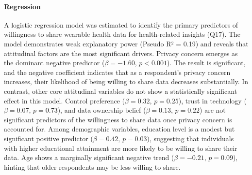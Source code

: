 		\paragraph{Regression}
		A logistic regression model was estimated to identify the primary predictors of willingness to share wearable health data for health-related insights (Q17). The model demonstrates weak explanatory power (Pseudo R² = 0.19) and reveals that attitudinal factors are the most significant drivers.
		Privacy concern emerges as the dominant negative predictor ($\beta = -1.60$, $p < 0.001$). The result is significant, and the negative coefficient indicates that as a respondent's privacy concern increases, their likelihood of being willing to share data decreases substantially.
		In contrast, other core attitudinal variables do not show a statistically significant effect in this model. Control preference ($\beta = 0.32$, $p = 0.25$), trust in technology ($\beta = 0.07$, $p = 0.73$), and data ownership belief ($\beta = 0.13$, $p = 0.22$) are not significant predictors of the willingness to share data once privacy concern is accounted for.
		Among demographic variables, education level is a modest but significant positive predictor ($\beta = 0.42$, $p = 0.03$), suggesting that individuals with higher educational attainment are more likely to be willing to share their data. Age shows a marginally significant negative trend ($\beta = -0.21$, $p = 0.09$), hinting that older respondents may be less willing to share.
